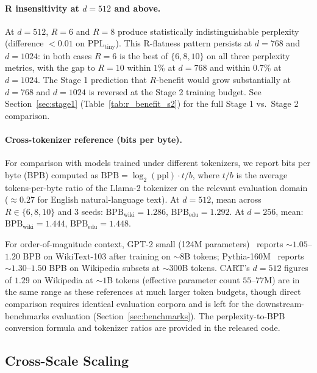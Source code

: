 \documentclass{article}
\newcommand{\cart}{\textsc{CART}}
\newcommand{\ppltiny}{PPL$_\text{tiny}$}
\begin{document}
\paragraph{R insensitivity at $d{=}512$ and above.}
At $d{=}512$, $R{=}6$ and $R{=}8$ produce statistically indistinguishable perplexity (difference $< 0.01$ on \ppltiny). This R-flatness pattern persists at $d{=}768$ and $d{=}1024$: in both cases $R{=}6$ is the best of $\{6, 8, 10\}$ on all three perplexity metrics, with the gap to $R{=}10$ within $1\%$ at $d{=}768$ and within $0.7\%$ at $d{=}1024$. The Stage 1 prediction that $R$-benefit would grow substantially at $d{=}768$ and $d{=}1024$ is reversed at the Stage 2 training budget. See Section~\ref{sec:stage1} (Table~\ref{tab:r_benefit_s2}) for the full Stage 1 vs.\ Stage 2 comparison.

\paragraph{Cross-tokenizer reference (bits per byte).}
For comparison with models trained under different tokenizers, we report bits per byte (BPB) computed as $\text{BPB} = \log_2(\text{ppl}) \cdot t/b$, where $t/b$ is the average tokens-per-byte ratio of the Llama-2 tokenizer on the relevant evaluation domain ($\approx 0.27$ for English natural-language text). At $d{=}512$, mean across $R \in \{6, 8, 10\}$ and 3 seeds: $\text{BPB}_\text{wiki} = 1.286$, $\text{BPB}_\text{edu} = 1.292$. At $d{=}256$, mean: $\text{BPB}_\text{wiki} = 1.444$, $\text{BPB}_\text{edu} = 1.448$.

For order-of-magnitude context, GPT-2 small (124M parameters)~\citep{radford2019gpt2} reports $\sim 1.05$--$1.20$ BPB on WikiText-103 after training on $\sim 8$B tokens; Pythia-160M~\citep{biderman2023pythia} reports $\sim 1.30$--$1.50$ BPB on Wikipedia subsets at $\sim 300$B tokens. \cart{}'s $d{=}512$ figures of $1.29$ on Wikipedia at $\sim 1$B tokens (effective parameter count $55$--$77$M) are in the same range as these references at much larger token budgets, though direct comparison requires identical evaluation corpora and is left for the downstream-benchmarks evaluation (Section~\ref{sec:benchmarks}). The perplexity-to-BPB conversion formula and tokenizer ratios are provided in the released code.

\subsection{Cross-Scale Scaling}
\label{sec:scaling}
\end{document}
